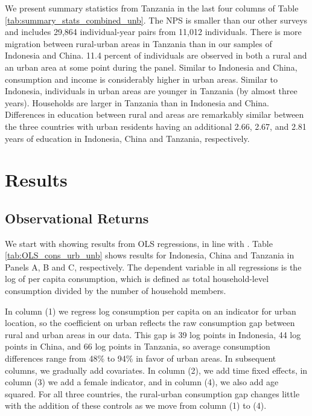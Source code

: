 \documentclass[12pt]{article}
\begin{document}
We present summary statistics from Tanzania in the last four columns of Table \ref{tab:summary_stats_combined_unb}. The NPS is smaller than our other surveys and includes 29,864 individual-year pairs from 11,012 individuals. There is more migration between rural-urban areas in Tanzania than in our samples of Indonesia and China. 11.4 percent of individuals are observed in both a rural and an urban area at some point during the panel.  Similar to Indonesia and China, consumption and income is considerably higher in urban areas. Similar to Indonesia, individuals in urban areas are younger in Tanzania (by almost three years). Households are larger in Tanzania than in Indonesia and China. Differences in education between rural and areas are remarkably similar between the three countries with urban residents having an additional 2.66, 2.67, and 2.81 years of education in Indonesia, China and Tanzania, respectively.

\section{Results}\label{sec:results}

\subsection{Observational Returns}\label{sec:observational-returns}

We start with showing results from OLS regressions, in line with 
\cite{hamoryReevaluatingAgriculturalProductivity2021}. 
Table \ref{tab:OLS_cons_urb_unb} shows results for Indonesia, China and Tanzania in Panels A, B and C, respectively. 
The dependent variable in all regressions is the log of per capita consumption, which is defined as total household-level consumption divided by the number of household members. 

In column (1) we regress log consumption per capita on an indicator for urban location, so the coefficient on urban reflects the raw consumption gap between rural and urban areas in our data. 
This gap is 39 log points in Indonesia, 44 log points in China, and 66 log points in Tanzania, so average consumption differences range from 48\% to 94\% in favor of urban areas.
In subsequent columns, we gradually add covariates.  
In column (2), we add time fixed effects, in column (3) we add a female indicator, and in column (4), we also add age squared. 
For all three countries, the rural-urban consumption gap changes little with the addition of these controls as we move from column (1) to (4). 
\end{document}
